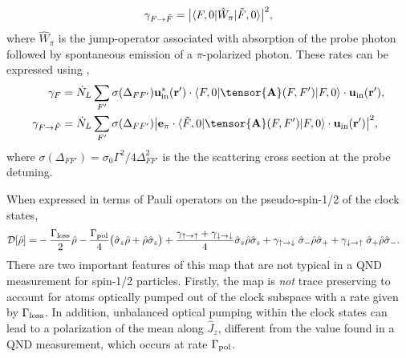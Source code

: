 \documentclass[preprint,aps,pra,onecolumn]{revtex4-1} %
\newcommand{\inp}{{\rm in}}
\newcommand{\gammauu}{\gamma_{\uparrow \rightarrow \uparrow}}
\newcommand{\gammadd}{\gamma_{\downarrow \rightarrow \downarrow}}
\newcommand{\gammaud}{\gamma_{\uparrow \rightarrow \downarrow}}
\newcommand{\gammadu}{\gamma_{\downarrow \rightarrow \uparrow}}
\newcommand{\gammau}{\gamma_{\uparrow}}
\newcommand{\gammad}{\gamma_{\downarrow}}
\newcommand{\gammap}{\tilde{\gamma}_\uparrow + \tilde{\gamma}_\downarrow}
\newcommand{\gammam}{\tilde{\gamma}_\uparrow - \tilde{\gamma}_\downarrow}
\newcommand{\lrate}{\Gamma_{\rm loss}}
\newcommand{\polrate}{\Gamma_{\rm pol}}
\begin{document}
	\begin{equation}
		\gamma_{F \rightarrow \tilde{F} } =\big| \langle{F,0}\rvert \hat{W}_\pi \lvert{\tilde{F},0}\rangle \big|^2,
	\end{equation}
where $\hat{W}_\pi$ is the jump-operator associated with absorption of the probe photon followed by spontaneous emission of a $\pi$-polarized photon.  These rates can be expressed using ,
	\begin{align}
		\gamma_F &=\dot{N}_L  \sum_{F'} \sigma (\Delta_{FF'} ) \mathbf{u}^*_\inp(\br')\cdot \bra{F,0} \tensor{\mathbf{A}}(F,F') \ket{F,0}  \cdot \mathbf{u}_\inp(\br'), \\
		\gamma_{F \rightarrow \tilde{F}}&=  \dot{N}_L  \sum_{F'} \sigma (\Delta_{FF'}) \big| \mathbf{e}_\pi\cdot \bra{\tilde{F},0} \tensor{\mathbf{A}}(F,F') \ket{F,0}  \cdot \mathbf{u}_\inp(\br') \big|^2 ,
	\end{align}
where $ \sigma (\Delta_{FF'} )  = \sigma_0 \Gamma^2/4\Delta^2_{FF'}$ is the the scattering cross section at the probe detuning.  

When expressed in terms of Pauli operators on the pseudo-spin-1/2 of the clock states,
	\begin{align} \label{Eq::OpticalPumpingMapSchr}
		\mathcal{D}[\hat{\rho}]   =& -\frac{ \lrate }{2} \hat{\rho} - \frac{ \polrate }{4} \big( \hat{\sigma}_z \hat{\rho} + \hat{\rho} \hat{\sigma}_z \big)+ \frac{\gammauu+\gammadd}{4} \hat{\sigma}_z \hat{\rho} \hat{\sigma}_z + \gammaud \; \hat{\sigma}_- \hat{\rho} \hat{\sigma}_+ + \gammadu \; \hat{\sigma}_+\hat{\rho} \hat{\sigma}_- .   
	\end{align} 
There are two important features of this map that are not typical in a QND measurement for spin-1/2 particles.  Firstly, the map is {\em not} trace preserving to account for atoms optically pumped out of the clock subspace with a rate given by $\lrate $.  In addition, unbalanced optical pumping within the clock states can lead to a polarization of the mean along $\hat{J}_z$, different from the value found in a QND measurement, which occurs at rate $\polrate$.	
\end{document}
